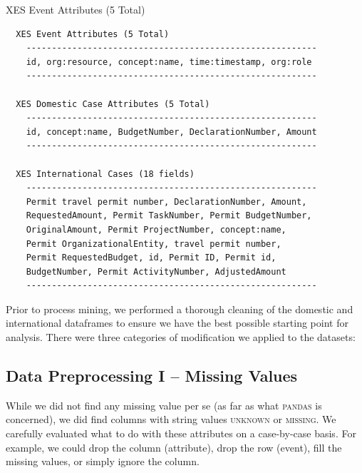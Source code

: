 \documentclass[conference]{IEEEtran}
\begin{document}
\begin{table}[htbp]
\caption{XES Event Attributes (5 Total)}
\vspace{-1em}
\begin{center}
\begin{verbatim}
  XES Event Attributes (5 Total)
    ---------------------------------------------------------
    id, org:resource, concept:name, time:timestamp, org:role
    ---------------------------------------------------------

  XES Domestic Case Attributes (5 Total)
    ---------------------------------------------------------
    id, concept:name, BudgetNumber, DeclarationNumber, Amount
    ---------------------------------------------------------

  XES International Cases (18 fields)
    ---------------------------------------------------------
    Permit travel permit number, DeclarationNumber, Amount,
    RequestedAmount, Permit TaskNumber, Permit BudgetNumber,
    OriginalAmount, Permit ProjectNumber, concept:name,
    Permit OrganizationalEntity, travel permit number,
    Permit RequestedBudget, id, Permit ID, Permit id,
    BudgetNumber, Permit ActivityNumber, AdjustedAmount        
    ---------------------------------------------------------
\end{verbatim}
\end{center}
\vspace{-1em}
\label{table-event}
\end{table}



Prior to process mining, we performed a thorough cleaning of the
domestic and international dataframes to ensure we have
the best possible starting
point for analysis. There were three categories of modification we applied
to the datasets:

\subsection{Data Preprocessing I -- Missing Values}

While we did not find any missing value per se (as far
as what \textsc{pandas} is concerned), we did find columns with string values
\textsc{unknown} or \textsc{missing}. We
carefully evaluated what to do with these attributes on a case-by-case
basis. For example, we could drop the column (attribute), drop the row
(event), fill the missing values, or simply ignore the column.
\end{document}
